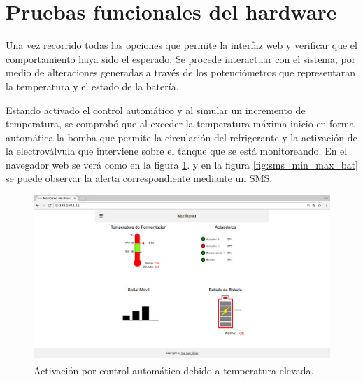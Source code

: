 
\section{Pruebas funcionales del hardware}
\label{sec:pruebasHW}

Una vez recorrido todas las opciones que permite la interfaz web y verificar que el comportamiento haya sido el esperado. Se procede interactuar con el sistema, por medio de alteraciones generadas a través de los potenciómetros que representaran la temperatura y el estado de la batería.

Estando activado el control automático y al simular un incremento de temperatura, se comprobó que al exceder la temperatura máxima inicio en forma automática la bomba que permite la circulación del refrigerante y la activación de la electroválvula que interviene sobre el tanque que se está monitoreando. En el navegador web se verá como en la figura \ref{fig:auto_control_active}. y en la figura \ref{fig:sms_min_max_bat} se puede observar la alerta correspondiente mediante un SMS.

\begin{figure}[h]
  \centering
  \includegraphics[scale=.25]{./Figures/auto_control_active.png}
  \caption{Activación por control automático debido a temperatura elevada.}
  \label{fig:auto_control_active}
\end{figure}


